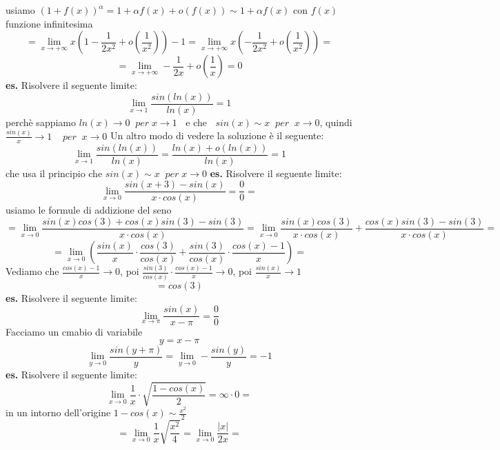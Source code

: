 usiamo $(1+f(x))^{\alpha} = 1 +\alpha f(x) + o(f(x)) \sim 1 +\alpha f(x)$ con $f(x)$ funzione infinitesima
\[
    = \lim_{x\rightarrow + \infty} x (1 - \frac{1}{2x^2} + o(\frac{1}{x^2}))-1 = \lim_{x\rightarrow + \infty} x (- \frac{1}{2x^2} + o(\frac{1}{x^2})) =
\]
\[
    = \lim_{x\rightarrow + \infty} -\frac{1}{2x} + o(\frac{1}{x}) = 0
\]
\newline
\newline
\textbf{es.} Risolvere il seguente limite:
\[
    \lim_{x\rightarrow 1} \frac{sin (ln(x))}{ln(x)} = 1
\]
perchè sappiamo $ln(x) \rightarrow 0 \;\; per \; x \rightarrow 1 \;\;$ e che $\;\; sin(x) \sim  x \;\; per \;\; x \rightarrow 0$, quindi $\frac{sin(x)}{x} \rightarrow  1 \;\;\;\; per \;\; x \rightarrow 0$
\newline
Un altro modo di vedere la soluzione è il seguente:
\[
    \lim_{x\rightarrow 1} \frac{sin (ln(x))}{ln(x)} = \frac{ln(x) + o(ln(x))}{ln(x)} = 1
\]
che usa il principio che $sin(x) \sim x \;\; per \; x \rightarrow 0$
\newline
\newline
\newline
\textbf{es.} Risolvere il seguente limite:
\[
    \lim_{x\rightarrow 0} \frac{sin(x+3)- sin(x)}{x \cdot  cos(x)} = \frac{0}{0} =
\]
usiamo le formule di addizione del seno
\[
    = \lim_{x\rightarrow 0} \frac{sin(x)cos(3) + cos(x)sin(3) - sin(3)}{x \cdot cos(x)} = \lim_{x\rightarrow 0}  \frac{sin(x)cos(3)}{x \cdot cos(x)} +  \frac{cos(x)sin(3) - sin(3)}{x \cdot cos(x)} = 
\]
\[
    = \lim_{x\rightarrow 0} (\frac{sin(x)}{x} \cdot \frac{cos(3)}{cos(x)} + \frac{sin(3)}{cos(x)} \cdot \frac{cos(x)-1}{x}) = 
\]
Vediamo che $\frac{cos(x)-1}{x} \rightarrow 0$, poi $\frac{sin(3)}{cos(x)} \cdot \frac{cos(x)-1}{x} \rightarrow 0$, poi  $\frac{sin(x)}{x} \rightarrow  1$
\[
    = cos(3)
\]
\newline
\newline
\textbf{es.} Risolvere il seguente limite:
\[
    \lim_{x\rightarrow \pi} \frac{sin(x)}{x-\pi} = \frac{0}{0}
\]
Facciamo un cmabio di variabile
\[
    y = x-  \pi
\]
\[
    \lim_{y\rightarrow 0} \frac{sin(y+\pi)}{y} = \lim_{y\rightarrow 0} -\frac{sin(y)}{y} = -1
\]
\newline
\newline
\textbf{es.} Risolvere il seguente limite:
\[
    \lim_{x\rightarrow 0} \frac{1}{x} \cdot \sqrt{\frac{1-cos(x)}{2}} = \infty \cdot 0 = 
\]
in un intorno dell'origine $1-cos(x) \sim  \frac{x^2}{2}$
\[
    = \lim_{x\rightarrow 0} \frac{1}{x} \sqrt{\frac{x^2}{4}} = \lim_{x\rightarrow 0} \frac{|x|}{2x}=
\]
